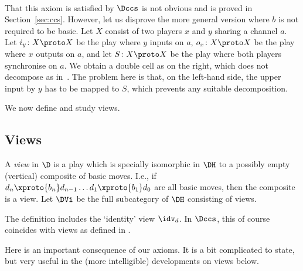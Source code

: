 \documentclass{LMCS}
\theoremstyle{plain}\newtheorem{satz}[thm]{Satz}
\begin{document}
\begin{exa} \hfill \  \linebreak
\begin{minipage}{\textwidth}
\begin{wrapfigure}[6]{r}{0pt}
  \begin{minipage}[c]{0.18\linewidth}
    \vspace*{-1.5em}
  \end{minipage}
\end{wrapfigure}
That this axiom is satisfied by $\Dccs$ is not obvious and is proved
in Section~\ref{sec:ccs}. However, let us disprove the more general
version where $b$ is not required to be basic. Let $X$ consist of two
players $x$ and $y$ sharing a channel $a$. Let $i_y \colon X \proto X$
be the play where $y$ inputs on $a$, $o_x \colon X \proto X$ be the
play where $x$ outputs on $a$, and let $S \colon X \proto X$ be the
play where both players synchronise on $a$.  We obtain a double cell
as on the right, which does not decompose as
in~. The problem here is that, on the left-hand
side, the upper input by $y$ has to be mapped to $S$, which prevents any
suitable decomposition.
\end{minipage}
\end{exa}

We now define and study views.

\subsection{Views}\label{subsec:views}
\begin{defi}
  A \emph{view} in $\D$ is a play which is specially isomorphic in
  $\DH$ to a possibly empty (vertical) composite of basic moves. I.e.,
  if
$d_n \xproto{b_{n}} d_{n-1} \ldots d_1 \xproto{b_1} d_0$
are all basic moves, then the composite is a view. Let $\DVi$ be the
full subcategory of $\DH$ consisting of views.
\end{defi}
The definition includes the `identity' view $\idv_{d}$. In $\Dccs$,
this of course coincides with views as defined in
.

Here is an important consequence of our axioms. It is a bit
complicated to state, but very useful in the (more intelligible)
developments on views below.
\end{document}
